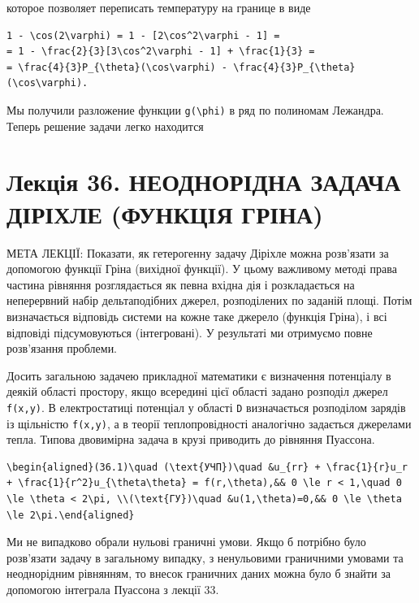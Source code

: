 \documentclass[
  ukrainian,
]{article}
\begin{document}
которое позволяет переписать температуру на границе в виде

\begin{verbatim}
1 - \cos(2\varphi) = 1 - [2\cos^2\varphi - 1] =
= 1 - \frac{2}{3}[3\cos^2\varphi - 1] + \frac{1}{3} =
= \frac{4}{3}P_{\theta}(\cos\varphi) - \frac{4}{3}P_{\theta}(\cos\varphi).
\end{verbatim}

Мы получили разложение функции \texttt{g(\textbackslash{}phi)} в ряд по
полиномам Лежандра. Теперь решение задачи легко находится

\section{Лекція 36. НЕОДНОРІДНА ЗАДАЧА ДІРІХЛЕ (ФУНКЦІЯ
ГРІНА)}\label{ux43bux435ux43aux446ux456ux44f-36.-ux43dux435ux43eux434ux43dux43eux440ux456ux434ux43dux430-ux437ux430ux434ux430ux447ux430-ux434ux456ux440ux456ux445ux43bux435-ux444ux443ux43dux43aux446ux456ux44f-ux433ux440ux456ux43dux430}

МЕТА ЛЕКЦІЇ: Показати, як гетерогенну задачу Діріхле можна розв'язати за
допомогою функції Гріна (вихідної функції). У цьому важливому методі
права частина рівняння розглядається як певна вхідна дія і розкладається
на неперервний набір дельтаподібних джерел, розподілених по заданій
площі. Потім визначається відповідь системи на кожне таке джерело
(функція Гріна), і всі відповіді підсумовуються (інтегровані). У
результаті ми отримуємо повне розв'язання проблеми.

Досить загальною задачею прикладної математики є визначення потенціалу в
деякій області простору, якщо всередині цієї області задано розподіл
джерел \texttt{f(x,y)}. В електростатиці потенціал у області \texttt{D}
визначається розподілом зарядів із щільністю \texttt{f(x,y)}, а в теорії
теплопровідності аналогічно задається джерелами тепла. Типова двовимірна
задача в крузі приводить до рівняння Пуассона.

\begin{verbatim}
\begin{aligned}(36.1)\quad (\text{УЧП})\quad &u_{rr} + \frac{1}{r}u_r + \frac{1}{r^2}u_{\theta\theta} = f(r,\theta),&& 0 \le r < 1,\quad 0 \le \theta < 2\pi, \\(\text{ГУ})\quad &u(1,\theta)=0,&& 0 \le \theta \le 2\pi.\end{aligned}
\end{verbatim}

Ми не випадково обрали нульові граничні умови. Якщо б потрібно було
розв'язати задачу в загальному випадку, з ненульовими граничними умовами
та неоднорідним рівнянням, то внесок граничних даних можна було б знайти
за допомогою інтеграла Пуассона з лекції 33.
\end{document}
